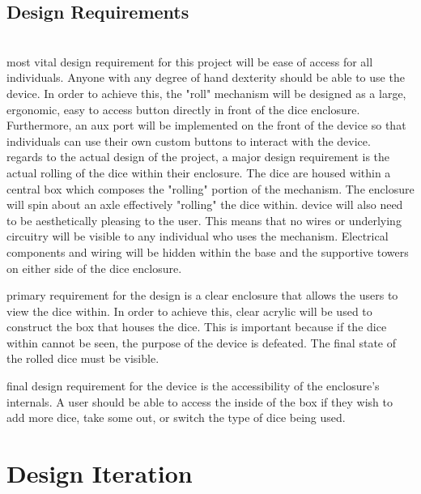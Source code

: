 \documentclass[12pt]{article}
\begin{document}
\subsection{Design Requirements}
\\
 most vital design requirement for this project will be ease of access for all individuals. Anyone with any degree of hand dexterity should be able to use the device. In order to achieve this, the "roll" mechanism will be designed as a large, ergonomic, easy to access button directly in front of the dice enclosure. Furthermore, an aux port will be implemented on the front of the device so that individuals can use their own custom buttons to interact with the device. \\
 regards to the actual design of the project, a major design requirement is the actual rolling of the dice within their enclosure. The dice are housed within a central box which composes the "rolling" portion of the mechanism. The enclosure will spin about an axle effectively "rolling" the dice within.
 device will also need to be aesthetically pleasing to the user. This means that no wires or underlying circuitry will be visible to any individual who uses the mechanism. Electrical components and wiring will be hidden within the base and the supportive towers on either side of the dice enclosure. 

 primary requirement for the design is a clear enclosure that allows the users to view the dice within. In order to achieve this, clear acrylic will be used to construct the box that houses the dice. This is important because if the dice within cannot be seen, the purpose of the device is defeated. The final state of the rolled dice must be visible. 

 final design requirement for the device is the accessibility of the enclosure's internals. A user should be able to access the inside of the box if they wish to add more dice, take some out, or switch the type of dice being used. 


\newpage
\section{Design Iteration}

\end{document}
